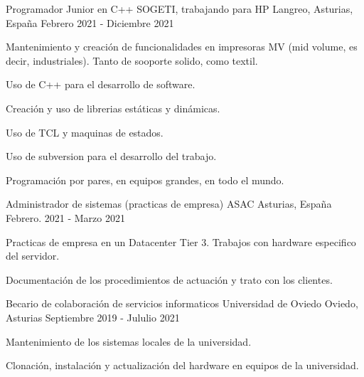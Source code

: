 \begin{cventries}
    \cventry
    {Programador Junior en C++} %
    {SOGETI, trabajando para HP} %
    {Langreo, Asturias, España} %
    {Febrero 2021 - Diciembre 2021} %
    {
        \begin{cvitems} %
            \item {Mantenimiento y creación de funcionalidades en impresoras MV (mid volume, es decir, industriales).
                        Tanto de sooporte solido, como textil.}
            \item {Uso de C++ para el desarrollo de software.}
            \item {Creación y uso de librerias estáticas y dinámicas.}
            \item {Uso de TCL y maquinas de estados.}
            \item {Uso de subversion para el desarrollo del trabajo.}
            \item {Programación por pares, en equipos grandes, en todo el mundo.}
        \end{cvitems}
    }

    \cventry
    {Administrador de sistemas (practicas de empresa)} %
    {ASAC} %
    {Asturias, España} %
    {Febrero. 2021 - Marzo 2021} %
    {
        \begin{cvitems} %
            \item {Practicas de empresa en un Datacenter Tier 3. Trabajos con hardware especifico del servidor.}
            \item {Documentación de los procedimientos de actuación y trato con los clientes.}
        \end{cvitems}
    }

    \cventry
    {Becario de colaboración de servicios informaticos} %
    {Universidad de Oviedo} %
    {Oviedo, Asturias} %
    {Septiembre 2019 - Jululio 2021} %
    {
        \begin{cvitems} %
            \item {Mantenimiento de los sistemas locales de la universidad.}
            \item {Clonación, instalación y actualización del hardware en equipos de la universidad.}
        \end{cvitems}
    }

\end{cventries}
